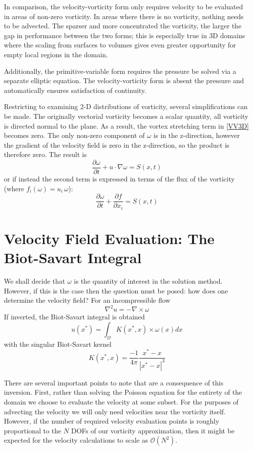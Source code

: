 \documentclass[letterpaper,12pt]{report}
\newcommand{\be}{\begin{equation}}
\newcommand{\ben}[1]{\begin{equation}\label{#1}}
\newcommand{\ee}{\end{equation}}
\begin{document}
In comparison, the velocity-vorticity form only requires velocity to be evaluated in areas of non-zero vorticity. In areas where there is no vorticity, nothing needs to be advected. The sparser and more concentrated the vorticity, the larger the gap in performance between the two forms; this is especially true in 3D domains where the scaling from surfaces to volumes gives even greater opportunity for empty local regions in the domain. 

Additionally, the primitive-variable form requires the pressure be  solved via a separate elliptic equation. The velocity-vorticity form is absent the pressure and automatically ensures satisfaction of continuity.

Restricting  to examining 2-D distributions of vorticity, several simplifications can be made. The originally vectorial vorticity becomes a scalar quantity, all vorticity is directed normal to the plane. As a result, the vortex stretching term in \eqref{VV3D} becomes zero. The only non-zero component of $\omega$ is in the z-direction, however the gradient of the velocity field is zero in the z-direction, so the product is therefore zero. The result is
\ben{VV2D} \frac{\partial \omega}{\partial t} + u \cdot \nabla \omega = S(x,t)\ee
or if instead the second term is expressed in terms of the flux of the vorticity (where $f_i(\omega)=u_i\,\omega$):
\ben{VV2DB} \frac{\partial \omega}{\partial t} + \frac{\partial f}{\partial x_i}= S(x,t)\ee

\section{Velocity Field Evaluation: The Biot-Savart Integral}
We shall decide that $\omega$ is the quantity of interest in the solution method. However, if this is the case then the question must be posed: how does one determine the velocity field? For an incompressible flow
\be \nabla^2 u = -\nabla \times \omega \ee
If inverted, the Biot-Savart integral is obtained
\ben{BS} u(x^*) = \int_\Omega K(x^*,x) \times \omega(x) dx \ee
with the singular Biot-Savart kernel
\ben{BSkern} K(x^*,x) = \frac{-1}{4 \pi} \frac{x^*-x}{|x^*-x|^3} \ee

There are several important points to note that are a consequence of this inversion. First, rather than solving the Poisson equation for the entirety of the domain we choose to evaluate the velocity at some subset. For the purposes of advecting the velocity we will only need velocities near the vorticity itself. However, if the number of required velocity evaluation points is roughly proportional to the $N$ DOFs of our vorticity approximation, then it might be expected for the velocity calculations to scale as $\mathcal{O}(N^2)$.
\end{document}
